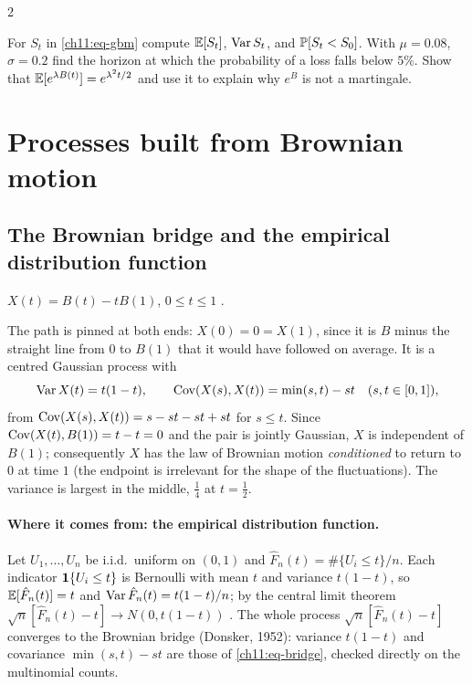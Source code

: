 \begin{paracol}{2}
\begin{exercise}\label{ch11:ex-gbm}
For $S_t$ in \eqref{ch11:eq-gbm} compute $\mathbb{E}[S_t]$, $\operatorname{Var} S_t$, and $\mathbb{P}[S_t<S_0]$. With $\mu=0.08$, $\sigma=0.2$ find the horizon at which the probability of a loss falls below $5\%$.
Show that $\mathbb{E}[e^{\lambda B(t)}]=e^{\lambda^2t/2}$ and use it to explain why $e^{B}$ is not a martingale.
\end{exercise}

\section{Processes built from Brownian motion}\label{ch11:sec-variants}

\subsection{The Brownian bridge and the empirical distribution function}\label{ch11:sec-bridge}
\begin{definition}\label{ch11:def-bridge}
$X(t)=B(t)-tB(1)$, $0\le t\le1$ .
\end{definition}
The path is pinned at both ends: $X(0)=0=X(1)$, since it is $B$ minus the straight line from $0$ to $B(1)$ that it would have followed on average. It is a centred Gaussian
process with
\begin{equation}\label{ch11:eq-bridge}
  \operatorname{Var} X(t)=t(1-t),\qquad \operatorname{Cov}(X(s),X(t))=\min(s,t)-st\quad(s,t\in[0,1]),
\end{equation}
from $\operatorname{Cov}(X(s),X(t))=s-st-st+st$ for $s\le t$. Since $\operatorname{Cov}(X(t),B(1))=t-t=0$ and the pair is jointly Gaussian, $X$ is independent of $B(1)$;
consequently $X$ has the law of Brownian motion \emph{conditioned} to return to $0$ at time $1$ (the endpoint is
irrelevant for the shape of the fluctuations). The variance is largest in the middle, $\tfrac14$ at $t=\tfrac12$.

\paragraph{Where it comes from: the empirical distribution function.} Let $U_1,\dots,U_n$ be i.i.d.\ uniform on $(0,1)$ and
$\hat F_n(t)=\#\{U_i\le t\}/n$. Each indicator $\mathbf{1}\{U_i\le t\}$ is Bernoulli with mean $t$ and variance $t(1-t)$, so $\mathbb{E}[\hat F_n(t)]=t$ and
$\operatorname{Var}\hat F_n(t)=t(1-t)/n$; by the central limit theorem
$\sqrt n[\hat F_n(t)-t]\to N(0,t(1-t))$ . The whole process $\sqrt n[\hat F_n(t)-t]$ converges to
the Brownian bridge (Donsker, 1952): variance $t(1-t)$ and covariance $\min(s,t)-st$ are those of \eqref{ch11:eq-bridge}, checked directly
on the multinomial counts.


\end{paracol}

